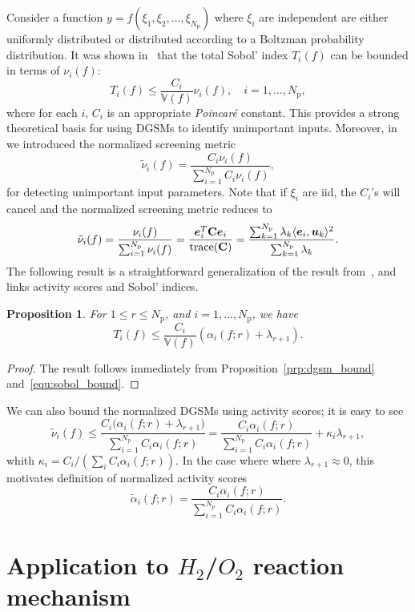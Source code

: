 \documentclass[1pt]{elsarticle}
\renewcommand{\vec}[1]{{\mathchoice
                     {\mbox{\boldmath$\displaystyle{#1}$}}
                     {\mbox{\boldmath$\textstyle{#1}$}}
                     {\mbox{\boldmath$\scriptstyle{#1}$}}
                     {\mbox{\boldmath$\scriptscriptstyle{#1}$}}}}
\newcommand{\V}{\mathbb{V}}
\newcommand{\ip}[2]{\langle{#1}, {#2}\rangle}
\newcommand{\trace}{\mathrm{trace}}
\newcommand{\mat}[1]{\mathbf{{#1}}}
\newcommand{\Np}{{N_\text{p}}}
\newtheorem{proposition}{Proposition}[section]
\begin{document}
Consider a function $y = f(\xi_1, \xi_2, \ldots, \xi_\Np)$ where
$\xi_i$ are independent are either uniformly distributed or
distributed according to a Boltzman probability distribution.  
It was shown in~\cite{LamboniIoossPopelinEtAl13} that the total Sobol' 
index $T_i(f)$ can be bounded in terms of $\nu_i(f)$:
\begin{equation}\label{equ:sobol_bound}
T_i(f) \leq \frac{C_i}{\V(f)}\nu_i(f), \quad i = 1, \ldots, \Np,
\end{equation}
where for each $i$, $C_i$ is an appropriate \emph{Poincar\'{e}} constant.
This provides a strong theoretical basis for using DGSMs to identify 
unimportant inputs. Moreover, 
in~\cite{VohraAlexanderianSaftaEtAl18} we introduced the normalized screening metric
\[
   \tilde{\nu}_i(f) = \frac{C_i \nu_i(f)}{\sum_{i=1}^\Np C_i \nu_i(f)},
\]
for detecting unimportant input parameters. 
Note that if $\xi_i$ are iid, the $C_i$'s will cancel and the normalized screening
metric reduces to 
\[
    \tilde{\nu}_i(f) = \frac{\nu_i(f)}{\sum_{i=1}^\Np \nu_i(f)} 
      = \frac{\vec{e}_i^T \mat{C} \vec{e}_i}{\trace(\mat{C})} 
      = \frac{\sum_{k=1}^\Np \lambda_k \ip{\vec{e}_i}{\vec{u}_k}^2}{\sum_{k = 1}^\Np \lambda_k}.
\]
The following result is a straightforward generalization of
the result from~\cite{Diaz16}, and 
links activity scores and Sobol' indices.
\begin{proposition}
For $1 \leq r \leq \Np$, and $i = 1, \ldots, \Np$, we have
\[
       T_i(f) \leq \frac{C_i}{\V(f)}(\alpha_i(f; r) + \lambda_{r+1}).
\]
\end{proposition}
\begin{proof}
The result follows immediately from Proposition~\ref{prp:dgsm_bound} and~\eqref{equ:sobol_bound}.
\end{proof}
We can also bound the normalized DGSMs using activity scores; it is easy to see  
\[
\tilde{\nu}_i(f) \leq 
\frac{ C_i \big(\alpha_i(f; r) + \lambda_{r+1}\big)}{\sum_{i=1}^\Np C_i \alpha_i(f; r)}
=\frac{C_i \alpha_i(f; r)}{\sum_{i=1}^\Np C_i \alpha_i(f; r)} + \kappa_i \lambda_{r+1}, 
\]
whith $\kappa_i = C_i / (\sum_i C_i \alpha_i(f; r))$. 
In the case where where $\lambda_{r+1} \approx 0$, 
this motivates definition of
normalized activity scores
\[
   \tilde{\alpha}_i(f; r) =  \frac{C_i \alpha_i(f; r)}{\sum_{i=1}^\Np C_i \alpha_i(f; r)}.
\] 

\section{Application to $H_2$/$O_2$ reaction mechanism}
\end{document}
